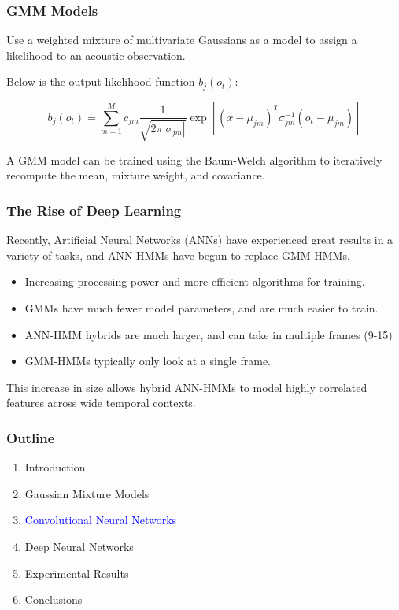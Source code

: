 \documentclass[notes]{beamer}
\begin{document}
\begin{frame}
	\frametitle{GMM Models}
	\begin{center}
		Use a weighted mixture of multivariate Gaussians as a model to assign a likelihood to an acoustic observation.
	\end{center}
	
	\begin{center}
	Below is the output likelihood function $b_{j}(o_{t})$:
	\end{center}
	
	\begin{equation*}
	b_{j}(o_{t}) = \sum_{m=1}^{M}c_{jm}\frac{1}{\sqrt{2\pi|\sigma_{jm}|}}\exp[(x-\mu_{jm})^T\sigma_{jm}^{-1}(o_{t}-\mu_{jm})]
	\end{equation*}
	
	\begin{center}
		A GMM model can be trained using the Baum-Welch algorithm to iteratively recompute the mean, mixture weight, and covariance.
	\end{center}

\end{frame}

\begin{frame}
	\frametitle{The Rise of Deep Learning}
	\begin{center}
		Recently, Artificial Neural Networks (ANNs) have experienced great results in a variety of tasks, and ANN-HMMs have begun to replace GMM-HMMs.
	\end{center}
	\begin{itemize}
		\item Increasing processing power and more efficient algorithms for training.
		\item GMMs have much fewer model parameters, and are much easier to train.
		\item ANN-HMM hybrids are much larger, and can take in multiple frames (9-15) 
		\item GMM-HMMs typically only look at a single frame.
	\end{itemize}
	
	\begin{center}
		This increase in size allows hybrid ANN-HMMs to model highly correlated features across wide temporal contexts.
	\end{center}
	
\end{frame}

\begin{frame}
	\frametitle{Outline}
	
	\begin{enumerate}
		\item Introduction
		\item Gaussian Mixture Models
		\item \textcolor{blue}{Convolutional Neural Networks}
		\item Deep Neural Networks
		\item Experimental Results
		\item Conclusions
	\end{enumerate}
\end{frame}
\end{document}
